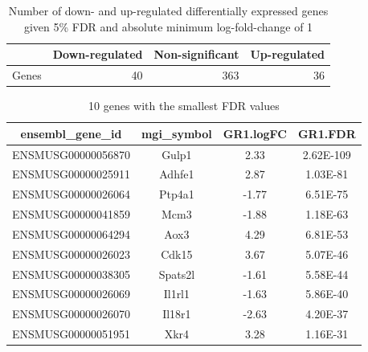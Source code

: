 \documentclass[12pt]{article}
\begin{document}
\begin{table}[ht]
\centering
\begin{tabular}{rrrr}
  \hline
 & Down-regulated & Non-significant & Up-regulated \\ 
  \hline
Genes & 40 & 363 & 36 \\ 
   \hline
\end{tabular}
\caption{Number of down- and up-regulated differentially expressed genes given 5\% FDR and absolute minimum log-fold-change of 1 } 
\end{table}%
\begin{table}[H]
\centering
\begingroup\footnotesize
\begin{tabular}{cccc}
  \hline
ensembl\_gene\_id & mgi\_symbol & GR1.logFC & GR1.FDR \\ 
  \hline
ENSMUSG00000056870 & Gulp1 & 2.33 & 2.62E-109 \\ 
  ENSMUSG00000025911 & Adhfe1 & 2.87 & 1.03E-81 \\ 
  ENSMUSG00000026064 & Ptp4a1 & -1.77 & 6.51E-75 \\ 
  ENSMUSG00000041859 & Mcm3 & -1.88 & 1.18E-63 \\ 
  ENSMUSG00000064294 & Aox3 & 4.29 & 6.81E-53 \\ 
  ENSMUSG00000026023 & Cdk15 & 3.67 & 5.07E-46 \\ 
  ENSMUSG00000038305 & Spats2l & -1.61 & 5.58E-44 \\ 
  ENSMUSG00000026069 & Il1rl1 & -1.63 & 5.86E-40 \\ 
  ENSMUSG00000026070 & Il18r1 & -2.63 & 4.20E-37 \\ 
  ENSMUSG00000051951 & Xkr4 & 3.28 & 1.16E-31 \\ 
   \hline
\end{tabular}
\endgroup
\caption{10 genes with the smallest FDR values} 
\end{table}
\end{document}
